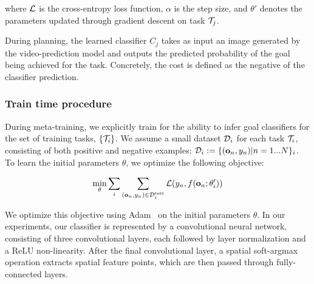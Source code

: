 where $\mathcal{L}$ is the cross-entropy loss function, $\alpha$ is the step size, and $\theta'$ denotes the parameters updated through gradient descent on task $\mathcal{T}_j$.

During planning, the learned classifier $C_j$ takes as input an image generated by the video-prediction model and outputs the predicted probability of the goal being achieved for the task. Concretely, the cost is defined as the negative of the classifier prediction.


\subsubsection{Train time procedure}
During meta-training, we explicitly train for the ability to infer goal classifiers for the set of training tasks, $\{ \mathcal{T}_i \}$. We assume a small dataset $\mathcal{D}_i$ for each task $\mathcal{T}_i$, consisting of both positive and negative examples: $\mathcal{D}_i:= \{(\mathbf{o}_n,y_n) | n=1...N \}_i$. To learn the initial parameters $\theta$, we optimize the following objective:

$$
\min_\theta \sum_i \sum_{(\mathbf{o}_n, y_n) \in \mathcal{D}^\text{test}_i} \mathcal{L}(y_n, f(\mathbf{o}_n; \theta_i')) 
$$

We optimize this objective using Adam~\cite{ADAM} on the initial parameters $\theta$. In our experiments, our classifier is represented by a convolutional neural network, consisting of three convolutional layers, each followed by layer normalization and a ReLU non-linearity. After the final convolutional layer, a spatial soft-argmax operation extracts spatial feature points, which are then passed through fully-connected layers.